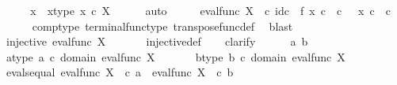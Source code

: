 \begin{isabellebody}
\ \ \isamarkupfalse%
\ \isamarkupfalse%
\ x\ \ x{\isacharunderscore}{\kern0pt}type{\isacharcolon}{\kern0pt}\ {\isachardoublequoteopen}x\ {\isasymin}\isactrlsub c\ X{\isachardoublequoteclose}\isanewline
\ \ \ \ \isamarkupfalse%
\ auto\isanewline
\ \ \isamarkupfalse%
\ \isamarkupfalse%
\ {\isachardoublequoteopen}eval{\isacharunderscore}{\kern0pt}func\ X\ {\isasymone}\ {\isasymcirc}\isactrlsub c\ id\isactrlsub c\ {\isasymone}\ {\isasymtimes}\isactrlsub f\ {\isacharparenleft}{\kern0pt}x\ {\isasymcirc}\isactrlsub c\ {\isasymbeta}\isactrlbsub {\isasymone}\ {\isasymtimes}\isactrlsub c\ {\isasymone}\isactrlesub {\isacharparenright}{\kern0pt}\isactrlsup {\isasymsharp}\ {\isacharequal}{\kern0pt}\ x\ {\isasymcirc}\isactrlsub c\ {\isasymbeta}\isactrlbsub {\isasymone}\ {\isasymtimes}\isactrlsub c\ {\isasymone}\isactrlesub {\isachardoublequoteclose}\isanewline
\ \ \ \ \isamarkupfalse%
\ comp{\isacharunderscore}{\kern0pt}type\ terminal{\isacharunderscore}{\kern0pt}func{\isacharunderscore}{\kern0pt}type\ transpose{\isacharunderscore}{\kern0pt}func{\isacharunderscore}{\kern0pt}def\ \isamarkupfalse%
\ blast\isanewline
\ \ \isanewline
\ \ \isamarkupfalse%
\ {\isachardoublequoteopen}injective\ {\isacharparenleft}{\kern0pt}eval{\isacharunderscore}{\kern0pt}func\ X\ {\isasymone}{\isacharparenright}{\kern0pt}{\isachardoublequoteclose}\isanewline
\ \ \ \ \isamarkupfalse%
\ injective{\isacharunderscore}{\kern0pt}def\isanewline
\ \ \isamarkupfalse%
\ clarify\isanewline
\ \ \ \ \isamarkupfalse%
\ a\ b\isanewline
\ \ \ \ \isamarkupfalse%
\ a{\isacharunderscore}{\kern0pt}type{\isacharcolon}{\kern0pt}\ {\isachardoublequoteopen}a\ {\isasymin}\isactrlsub c\ domain\ {\isacharparenleft}{\kern0pt}eval{\isacharunderscore}{\kern0pt}func\ X\ {\isasymone}{\isacharparenright}{\kern0pt}{\isachardoublequoteclose}\isanewline
\ \ \ \ \isamarkupfalse%
\ b{\isacharunderscore}{\kern0pt}type{\isacharcolon}{\kern0pt}\ {\isachardoublequoteopen}b\ {\isasymin}\isactrlsub c\ domain\ {\isacharparenleft}{\kern0pt}eval{\isacharunderscore}{\kern0pt}func\ X\ {\isasymone}{\isacharparenright}{\kern0pt}{\isachardoublequoteclose}\isanewline
\ \ \ \ \isamarkupfalse%
\ evals{\isacharunderscore}{\kern0pt}equal{\isacharcolon}{\kern0pt}\ {\isachardoublequoteopen}eval{\isacharunderscore}{\kern0pt}func\ X\ {\isasymone}\ {\isasymcirc}\isactrlsub c\ a\ {\isacharequal}{\kern0pt}\ eval{\isacharunderscore}{\kern0pt}func\ X\ {\isasymone}\ {\isasymcirc}\isactrlsub c\ b{\isachardoublequoteclose}\isanewline

\end{isabellebody}
